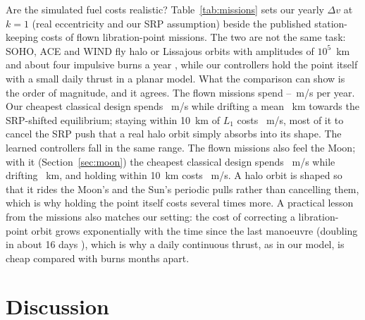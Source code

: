 \documentclass[11pt,a4paper]{article}
\newcommand{\dv}{\Delta v}
\begin{document}
Are the simulated fuel costs realistic? Table~\ref{tab:missions} sets our
yearly $\dv$ at $k = 1$ (real eccentricity and our SRP assumption) beside the
published station-keeping costs of flown libration-point missions. The two are
not the same task: SOHO, ACE and WIND fly halo or Lissajous orbits with
amplitudes of $10^5$~km and about four impulsive burns a year
\cite{roberts2011}, while our controllers hold the point itself with a small
daily thrust in a planar model. What the comparison can show is the order of
magnitude, and it agrees. The flown missions spend
\msFlownMin--\msFlownMax~m/s per year. Our cheapest classical design spends
\msLooseDv~m/s while drifting a mean \msLooseDist~km towards the SRP-shifted
equilibrium; staying within 10~km of $L_1$ costs \msTightDv~m/s, most of it to
cancel the SRP push that a real halo orbit simply absorbs into its shape. The
learned controllers fall in the same range. The flown missions also feel the
Moon; with it (Section~\ref{sec:moon}) the cheapest classical design spends
\msMoonLooseDv~m/s while drifting \msMoonLooseDist~km, and holding within
10~km costs \msMoonTightDv~m/s. A halo orbit is shaped so that it rides the
Moon's and the Sun's periodic pulls rather than cancelling them, which is why
holding the point itself costs several times more. A practical lesson from the
missions also matches our setting: the cost of correcting a libration-point
orbit grows exponentially with the time since the last manoeuvre (doubling in
about 16 days \cite{roberts2011}), which is why a daily continuous thrust, as
in our model, is cheap compared with burns months apart.

\begin{table}[t]
\centering
\caption{Yearly station-keeping $\dv$ of flown missions and of this work at
$k = 1$, without and with the Moon (holding, test seeds). $^{*}$Derived: average burn size $\times$ four
burns a year (SOHO 0.09, WIND 0.17~m/s per burn), or the planned 25.5~m/s over
10.5 years (JWST). Different tasks: compare orders of magnitude only.}
\label{tab:missions}
\small

\end{table}

\section{Discussion}
\end{document}
